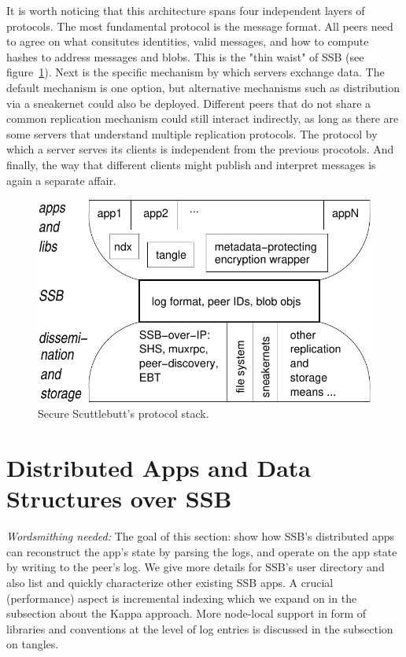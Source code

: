 \documentclass[sigconf]{acmart}
\begin{document}
It is worth noticing that this architecture spans four independent layers of protocols. The most fundamental protocol is the message format. All peers need to agree on what consitutes identities, valid messages, and how to compute hashes to address messages and blobs. This is the "thin waist" of SSB (see figure~\ref{fig:waist}).
Next is the specific mechanism by which servers exchange data. The default mechanism is one option, but alternative mechanisms such as distribution via a sneakernet could also be deployed. Different peers that do not share a common replication mechanism could still interact indirectly, as long as there are some servers that understand multiple replication protocols. The protocol by which a server serves its clients is independent from the previous procotols. And finally, the way that different clients might publish and interpret messages is again a separate affair.

\begin{figure}[htb]
  \includegraphics[width=0.9\columnwidth]{figs/ssb-waist.pdf}
  \caption{Secure Scuttlebutt's protocol stack.}
  \label{fig:waist}
\end{figure}

\section{Distributed Apps and Data Structures over SSB}

{\em Wordsmithing needed:}
The goal of this section: show how SSB's distributed apps can reconstruct
the app's state by parsing the logs, and operate on the app state by
writing to the peer's log. We give more details for SSB's user
directory and also list and quickly characterize other existing
SSB apps. A crucial (performance) aspect is incremental indexing
which we expand on in the subsection about the Kappa approach. More
node-local support in form of libraries and conventions at the level
of log entries is discussed in the subsection on tangles.
\end{document}
